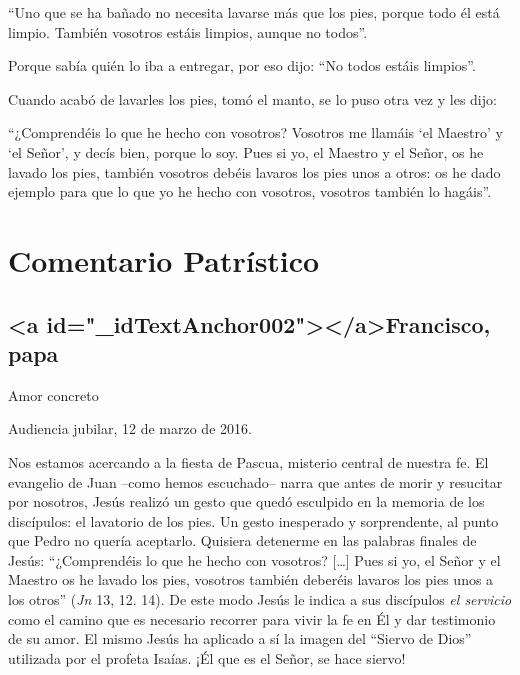 			\begin{readtalk}“Uno que se ha bañado no necesita lavarse más que los pies, porque todo él está limpio. También vosotros estáis limpios, aunque no todos”. \end{readtalk}
			
			\begin{readbody}Porque sabía quién lo iba a entregar, por eso dijo: “No todos estáis limpios”. \end{readbody}
			
			\begin{readbody}Cuando acabó de lavarles los pies, tomó el manto, se lo puso otra vez y les dijo: \end{readbody}
			
			\begin{readtalk}“¿Comprendéis lo que he hecho con vosotros? Vosotros me llamáis ‘el Maestro’ y ‘el Señor’, y decís bien, porque lo soy. Pues si yo, el Maestro y el Señor, os he lavado los pies, también vosotros debéis lavaros los pies unos a otros: os he dado ejemplo para que lo que yo he hecho con vosotros, vosotros también lo hagáis”.\end{readtalk}
			
			\section{Comentario Patrístico}
			
			\subsection{<a id="_idTextAnchor002"></a>Francisco, papa}
			
			\begin{patertheme}Amor concreto\end{patertheme}
			
			\begin{patersource}Audiencia jubilar, 12 de marzo de 2016.\end{patersource}
			
			\begin{body}Nos estamos acercando a la fiesta de Pascua, misterio central de nuestra fe. El evangelio de Juan –como hemos escuchado– narra que antes de morir y resucitar por nosotros, Jesús realizó un gesto que quedó esculpido en la memoria de los discípulos: el lavatorio de los pies. Un gesto inesperado y sorprendente, al punto que Pedro no quería aceptarlo. Quisiera detenerme en las palabras finales de Jesús: “¿Comprendéis lo que he hecho con vosotros? […] Pues si yo, el Señor y el Maestro os he lavado los pies, vosotros también deberéis lavaros los pies unos a los otros” (\textit{Jn }13, 12. 14). De este modo Jesús le indica a sus discípulos\textit{ el servicio} como el camino que es necesario recorrer para vivir la fe en Él y dar testimonio de su amor. El mismo Jesús ha aplicado a sí la imagen del “Siervo de Dios” utilizada por el profeta Isaías. ¡Él que es el Señor, se hace siervo!\end{body}
			

